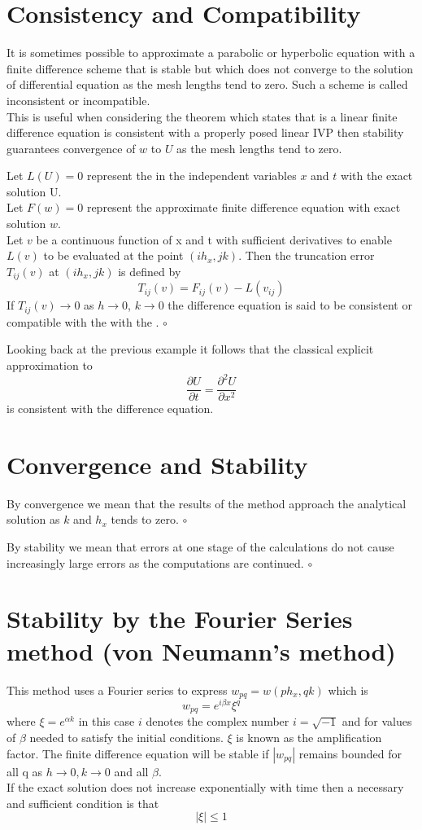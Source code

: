 \section{Consistency and Compatibility}
It is sometimes possible to approximate a parabolic or hyperbolic equation with a
finite difference scheme that is stable but which does not converge to the solution
of differential equation as the mesh lengths tend to zero.  Such a scheme is called inconsistent or incompatible.\\
This is useful when considering the theorem which states that is a linear finite
difference equation is consistent with a properly posed linear IVP then stability guarantees convergence of $w$ to $U$ as the mesh lengths tend to zero.

\begin{definition}
Let $L(U)=0$ represent the  in the independent variables $x$ and $t$ with
the exact solution U.\\
Let $F(w)=0$ represent the approximate finite difference equation with exact 
solution $w$.\\
Let $v$ be a continuous function of x and t with sufficient derivatives to enable
$L(v)$ to be evaluated at the point $(ih_x,jk)$.  Then the truncation error $T_{ij}(v)$ at $ (ih_x,jk)$ is defined by
\[T_{ij}(v)=F_{ij}(v)-L(v_{ij})\]
If $T_{ij}(v) \rightarrow 0$ as $h \rightarrow 0$,  $k \rightarrow 0$
the difference equation is said to be consistent or compatible with the with the .
$\circ$
\end{definition}
Looking back at the previous example it follows that the classical explicit approximation to 
\[\frac{\partial U}{\partial t} = \frac{\partial^2 U}{\partial x^2} \]
is consistent with the difference equation.
\section{Convergence and Stability}
\begin{definition}
By convergence we mean that the results of the method approach the analytical solution as $k$ and $h_x$ tends to zero.
$\circ$
\end{definition}
\begin{definition}
By stability we mean that errors at one stage of the calculations do not cause
increasingly large errors as  the computations are continued.
$\circ$
\end{definition}
\section{Stability by the Fourier Series method (von Neumann's method)}
This method uses a Fourier series to express $w_{pq}=w(ph_x,qk)$
which is
\[ w_{pq}=e^{i\beta x}\xi^{q} \]
where $\xi=e^{\alpha k}$ in this case $i$ denotes the complex number
$i=\sqrt{-1}$ and for values of $\beta$ needed to satisfy the initial conditions.
$\xi$ is known as the amplification factor.
The finite difference equation will be stable if $|w_{pq}|$ remains bounded for all q as $h \rightarrow 0, k\rightarrow 0$ and all $\beta$.\\
If the exact solution does not increase exponentially with time then a necessary
and sufficient condition is that 
\[ |\xi|\leq 1 \]
